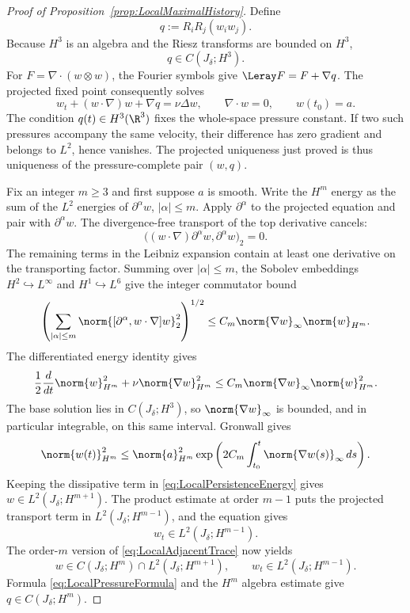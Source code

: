 \begin{proof}[Proof of Proposition~\ref{prop:LocalMaximalHistory}]

Define
\begin{equation}
  q:=R_iR_j(w_iw_j).
  \label{eq:LocalPressureFormula}
\end{equation}
Because \(H^3\) is an algebra and the Riesz transforms are bounded on \(H^3\),
\[
  q\in C(J_\delta;H^3).
\]
For \(F=\nabla\!\cdot(w\otimes w)\), the Fourier symbols give
\(\Leray F=F+\nabla q\). The projected fixed point consequently solves
\[
  w_t+(w\cdot\nabla)w+\nabla q=\nu\Delta w,
  \qquad
  \nabla\cdot w=0,
  \qquad
  w(t_0)=a.
\]
The condition \(q(t)\in H^3(\R^3)\) fixes the whole-space pressure constant.
If two such pressures accompany the same velocity, their difference has zero
gradient and belongs to \(L^2\), hence vanishes. The projected uniqueness just
proved is thus uniqueness of the pressure-complete pair \((w,q)\).


Fix an integer \(m\geq3\) and first suppose \(a\) is smooth. Write
the \(H^m\) energy as the sum of the \(L^2\) energies of
\(\partial^\alpha w\), \(|\alpha|\leq m\). Apply \(\partial^\alpha\) to the
projected equation and pair with \(\partial^\alpha w\). The divergence-free
transport of the top derivative cancels:
\[
  \bigl((w\cdot\nabla)\partial^\alpha w,\partial^\alpha w\bigr)_2=0.
\]
The remaining terms in the Leibniz expansion contain at least one derivative
on the transporting factor. Summing over \(|\alpha|\leq m\), the Sobolev
embeddings \(H^2\hookrightarrow L^\infty\) and \(H^1\hookrightarrow L^6\)
give the integer commutator bound
\[
  \left(
  \sum_{|\alpha|\leq m}
  \norm{[\partial^\alpha,w\cdot\nabla]w}_2^2
  \right)^{1/2}
  \leq C_m\norm{\nabla w}_\infty\norm{w}_{H^m}.
\]
The differentiated energy identity gives
\begin{equation}
  \frac12\frac d{dt}\norm{w}_{H^m}^2
  +\nu\norm{\nabla w}_{H^m}^2
  \leq C_m\norm{\nabla w}_\infty\norm{w}_{H^m}^2.
  \label{eq:LocalPersistenceEnergy}
\end{equation}
The base solution lies in \(C(J_\delta;H^3)\), so
\(\norm{\nabla w}_\infty\) is bounded, and in particular integrable, on this
same interval. Gronwall gives
\begin{equation}
  \norm{w(t)}_{H^m}^2
  \leq
  \norm{a}_{H^m}^2
  \exp\left(
    2C_m\int_{t_0}^{t}\norm{\nabla w(s)}_\infty\,ds
  \right).
  \label{eq:LocalPersistenceBound}
\end{equation}
Keeping the dissipative term in \eqref{eq:LocalPersistenceEnergy} gives
\(w\in L^2(J_\delta;H^{m+1})\). The product estimate at order \(m-1\)
puts the projected transport term in \(L^2(J_\delta;H^{m-1})\), and the
equation gives
\[
  w_t\in L^2(J_\delta;H^{m-1}).
\]
The order-\(m\) version of \eqref{eq:LocalAdjacentTrace} now yields
\begin{equation}
  w\in C(J_\delta;H^m)
  \cap L^2(J_\delta;H^{m+1}),
  \qquad
  w_t\in L^2(J_\delta;H^{m-1}).
  \label{eq:LocalHigherPersistence}
\end{equation}
Formula \eqref{eq:LocalPressureFormula} and the \(H^m\) algebra estimate give
\(q\in C(J_\delta;H^m)\).


\end{proof}

